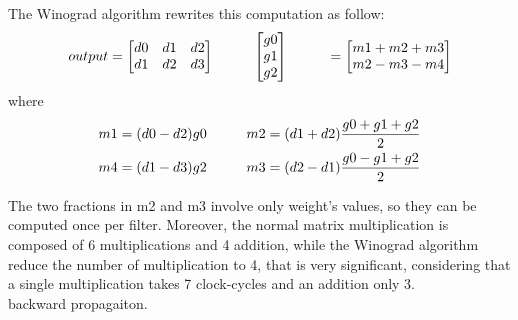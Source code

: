 \documentclass[a4paper, 10pt]{book}
\begin{document}
The Winograd algorithm rewrites this computation as follow:
\begin{equation}
    \label{out_winograd}
output = \begin{bmatrix} 
	d0 & d1 & d2 \\
        d1 & d2 & d3 \\
 
	\end{bmatrix}
 \hspace* {1cm}
 \begin{bmatrix} 
	g0 \\ 
        g1 \\ 
        g2
	\end{bmatrix}
\hspace* {1cm}
= \begin{bmatrix}
        m1 + m2 +m3\\
        m2 -m3 -m4
        \end{bmatrix}\end{equation}
where
\begin{align*}
    \label{m1_4}
    m1 = (d0-d2)g0\hspace* {1cm}  m2 = (d1+d2)\frac{g0+g1+g2}{2} \\
    m4 = (d1-d3)g2\hspace* {1cm}  m3 = (d2-d1)\frac{g0-g1+g2}{2}
\end{align*}

The two fractions in m2 and m3 involve only weight's values, so they can be computed once per filter. Moreover, the normal matrix multiplication is composed of 6 multiplications and 4 addition, while the Winograd algorithm reduce the number of multiplication to 4, that is very significant, considering that a single multiplication takes 7 clock-cycles and an addition only 3.
\\
backward propagaiton.
\end{document}
